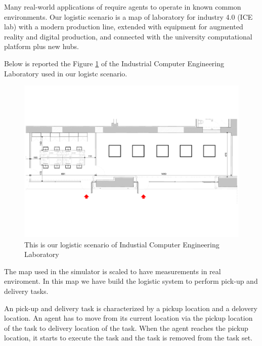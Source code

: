 Many real-world applications of \mrs require agents to operate
in known common environments. 
Our logistic scenario is a map of laboratory for industry 4.0 (ICE lab) with a modern production line,
extended with equipment for augmented reality and digital production, and connected with the university
computational platform plus new hubs.

Below is reported the Figure \ref{fig:ICE lab} of the Industrial Computer Engineering Laboratory used in our 
logistc scenario.

\begin{figure} [hbt]
    \centering
    \includegraphics[width=\textwidth]{img/model1.pdf}
    \caption{This is our logistic scenario of Industial Computer Engineering Laboratory}
    \label{fig:ICE lab}
\end{figure}

The map used in the simulator is scaled to have measurements in real enviroment.
In this map we have build the logistic system to perform pick-up and delivery tasks.

An pick-up and delivery task is characterized by a pickup location and a delovery location.
An agent has to move from its current location via the pickup location of the task to
delivery location of the task. When the agent reaches the pickup location, it starts 
to execute the task and the task is removed from the task set.

